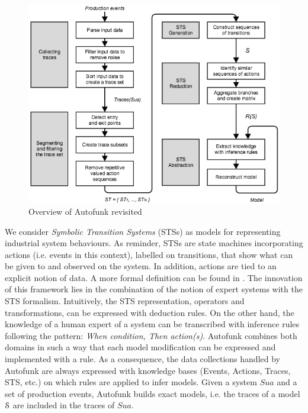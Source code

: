 \begin{figure}[ht]
\includegraphics[width=1.0\linewidth]{figures/autofunk.png}

\caption{Overview of Autofunk revisited}
\label{fig:prodsystems:autofunk-overview}
\end{figure}

We consider \textit{Symbolic Transition Systems} (STSs) as models
for representing industrial system behaviours. As reminder, STSs
are state machines incorporating actions (i.e. events in this
context), labelled on transitions, that show what can be given to
and observed on the system. In addition, actions are tied to an
explicit notion of data. A more formal definition can be found
in .
The innovation of this framework lies in
the combination of the notion of expert systems with the STS
formalism. Intuitively, the STS representation, operators and
transformations, can be expressed with deduction rules. On the
other hand, the knowledge of a human expert of a system can be
transcribed with inference rules following the pattern:
\textit{When condition, Then action(s)}. Autofunk combines both
domains in such a way that each model modification can be
expressed and implemented with a rule. As a consequence, the data
collections handled by Autofunk are always expressed with
knowledge bases (Events, Actions, Traces, STS, etc.) on which
rules are applied to infer models. Given a system $Sua$ and a set
of production events, Autofunk builds exact models, i.e. the
traces of a model $\EuScript{S}$ are included in the traces of
$Sua$.

